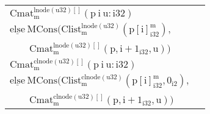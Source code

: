 \begin{table}[H]
\begin{scriptsize}
\begin{center}
\begin{tabular}{|l|l|}
\hline
$\mathrm{Cmat^{lnode(u32)[]}_m(p\ i\ u:i32)}$ & \makecell[l]{\Tstrut $\mathrm{\underline{if}\ (i \geq u)}$ $\mathrm{\underline{then}\ MNil}$ \\ \Bstrut $\mathrm{\underline{else}\ MCons(Clist^{lnode(u32)}_m(p[i]^m_{i32}),}$ \\ \qquad\qquad\ \ \ \  $\mathrm{Cmat^{lnode(u32)[]}_m(p,i+1_{i32},u))}$} \\
\hline
$\mathrm{Cmat^{clnode(u32)[]}_m(p\ i\ u:i32)}$ & \makecell[l]{\Tstrut $\mathrm{\underline{if}\ (i \geq u)}$ $\mathrm{\underline{then}\ MNil}$ \\ \Bstrut $\mathrm{\underline{else}\ MCons(Clist^{clnode(u32)}_m(p[i]^m_{i32},0_{i2}),}$ \\ \qquad\qquad\ \ \ \  $\mathrm{Cmat^{clnode(u32)[]}_m(p,i+1_{i32},u))}$} \\
\hline
\end{tabular}
\end{center}
\end{scriptsize}
\end{table}
